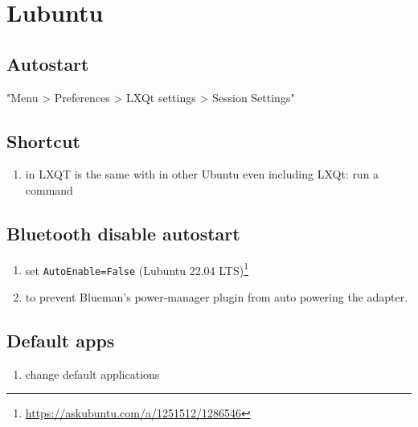 \chapter{Lubuntu}

\section{Autostart}
"Menu > Preferences > LXQt settings > Session Settings"

\section{Shortcut}
\begin{enumerate}
\item {} in LXQT is the same with  in other Ubuntu even including LXQt: run a command 
\end{enumerate}

\section{Bluetooth disable autostart}
\begin{enumerate}
\item{} set \verb|AutoEnable=False| (Lubuntu 22.04 LTS)\footnote{\url{https://askubuntu.com/a/1251512/1286546}}
\item{} 
to prevent Blueman's power-manager plugin from auto powering the adapter.
\end{enumerate}

\section{Default apps}
\begin{enumerate}
\item{} change default applications
\end{enumerate}
